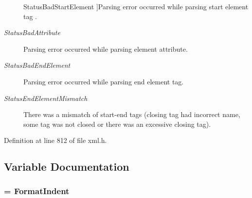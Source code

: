 \begin{Desc}
\begin{description}
{\hypertarget{namespacephys_1_1xml_ae7aabb879b21c73d8183a54470f8917fadbc5b334b4215ce2332073de46c58155}{
StatusBadStartElement}
\label{d9/d27/namespacephys_1_1xml_ae7aabb879b21c73d8183a54470f8917fadbc5b334b4215ce2332073de46c58155}
}]Parsing error occurred while parsing start element tag . \item[{\em 
\hypertarget{namespacephys_1_1xml_ae7aabb879b21c73d8183a54470f8917fac5fdddc5cc4d127aa5c53efb85846ccf}{
StatusBadAttribute}
\label{d9/d27/namespacephys_1_1xml_ae7aabb879b21c73d8183a54470f8917fac5fdddc5cc4d127aa5c53efb85846ccf}
}]Parsing error occurred while parsing element attribute. \item[{\em 
\hypertarget{namespacephys_1_1xml_ae7aabb879b21c73d8183a54470f8917fa72532447020c081f343c4a719add7450}{
StatusBadEndElement}
\label{d9/d27/namespacephys_1_1xml_ae7aabb879b21c73d8183a54470f8917fa72532447020c081f343c4a719add7450}
}]Parsing error occurred while parsing end element tag. \item[{\em 
\hypertarget{namespacephys_1_1xml_ae7aabb879b21c73d8183a54470f8917fa6b8d817142e0898ad9b1c61cfa54b8ea}{
StatusEndElementMismatch}
\label{d9/d27/namespacephys_1_1xml_ae7aabb879b21c73d8183a54470f8917fa6b8d817142e0898ad9b1c61cfa54b8ea}
}]There was a mismatch of start-\/end tags (closing tag had incorrect name, some tag was not closed or there was an excessive closing tag). \end{description}
\end{Desc}



Definition at line 812 of file xml.h.



\subsection{Variable Documentation}
\hypertarget{namespacephys_1_1xml_a08bf6aab51f79929d9097706a5e64408}{
\subsubsection[{FormatDefault}]{ = {\bf FormatIndent}}}
\label{d9/d27/namespacephys_1_1xml_a08bf6aab51f79929d9097706a5e64408}


